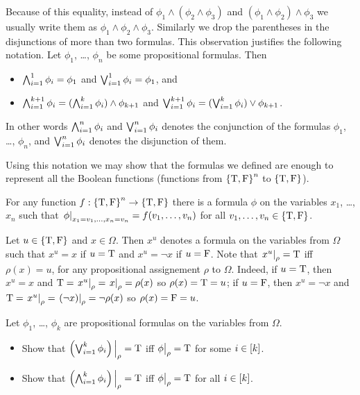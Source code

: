 Because of this equality, instead of $\phi_1 \land (\phi_2 \land \phi_3)$ and
$(\phi_1 \land \phi_2) \land \phi_3$ we usually write them
as $\phi_1 \land \phi_2 \land \phi_3$. Similarly we drop the
parentheses in the disjunctions of more than two formulas. This observation
justifies the following notation.
Let $\phi_1$, \dots, $\phi_n$ be some propositional formulas. Then
\begin{itemize}
  \item $\bigwedge_{i = 1}^1 \phi_i = \phi_1$ and
    $\bigvee_{i = 1}^1 \phi_i = \phi_1$, and
  \item $\bigwedge_{i = 1}^{k + 1} \phi_i =
    (\bigwedge_{i = 1}^{k} \phi_i) \land \phi_{k + 1}$ and
    $\bigvee_{i = 1}^{k + 1} \phi_i =
      (\bigvee_{i = 1}^{k} \phi_i) \lor \phi_{k + 1}$.
\end{itemize}
In other words $\bigwedge_{i = 1}^n \phi_i$ and $\bigvee_{i = 1}^n \phi_i$
denotes the conjunction of the formulas $\phi_1$, \dots, $\phi_n$, and
$\bigvee_{i = 1}^n \phi_i$ denotes the disjunction of them.


Using this notation we may show that the formulas we defined are enough to
represent all the Boolean functions
(functions from $\set{\ltrue, \lfalse}^n$ to $\set{\ltrue, \lfalse}$).
\begin{theorem}
\label{theorem:function-to-formula}
  For any function $f : \set{\ltrue, \lfalse}^n \to
  \set{\ltrue, \lfalse}$ there is a
  formula $\phi$ on the variables $x_1$, \dots, $x_n$ such that
  $\left. {\phi} \right\rvert_{x_1 = v_1, \dots, x_n = v_n} = f(v_1, \dots, v_n)$ for all
  $v_1, \dots, v_n \in \set{\ltrue, \lfalse}$.
\end{theorem}

Let $u \in \set{\ltrue, \lfalse}$ and $x \in \Omega$. Then $x^u$ denotes a
formula on the variables from $\Omega$ such that $x^u = x$ if $u = \text{T}$ and
$x^u = \lnot x$ if $u = \text{F}$. Note that $\left. {x^u} \right\rvert_{\rho} = \text{T}$
iff $\rho(x) = u$, for any propositional assignement $\rho$ to $\Omega$.
Indeed, if $u = \text{T}$, then $x^u = x$ and
$\text{T} = \left. {x^u} \right\rvert_{\rho} = \left. {x} \right\rvert_{\rho} = \rho(x)$ so
$\rho(x) = \text{T} = u$;
if $u = \text{F}$, then $x^u = \lnot x$ and
$\text{T} = \left. {x^u} \right\rvert_{\rho} = \left. {\left(\lnot x\right)} \right\rvert_{\rho} =
\lnot \rho(x)$ so $\rho(x) = \text{F} = u$.

\begin{exercise}
  Let $\phi_1$, \dots, $\phi_k$ are propositional formulas
  on the variables from $\Omega$.
  \begin{itemize}
    \item Show that
      $\left(\bigvee_{i = 1}^k \phi_i\right)\Big\rvert_\rho = \text{T}$ iff
      $\phi\big\rvert_{\rho} = \text{T}$ for some $i \in [{k}]$.
    \item Show that
      $\left(\bigwedge_{i = 1}^k \phi_i\right)\Big\rvert_\rho = \text{T}$ iff
      $\phi\big\rvert_{\rho} = \text{T}$ for all $i \in [{k}]$.
  \end{itemize}
\end{exercise}

